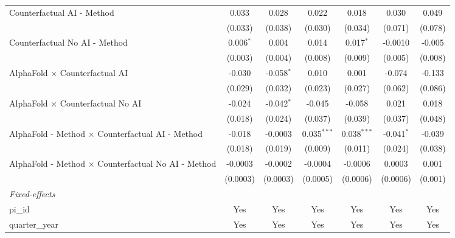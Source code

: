 \begin{tabular}{lcccccc}
   Counterfactual AI - Method                                 & 0.033       & 0.028        & 0.022         & 0.018         & 0.030        & 0.049\\   
                                                              & (0.033)     & (0.038)      & (0.030)       & (0.034)       & (0.071)      & (0.078)\\   
   Counterfactual No AI - Method                              & 0.006$^{*}$ & 0.004        & 0.014         & 0.017$^{*}$   & -0.0010      & -0.005\\   
                                                              & (0.003)     & (0.004)      & (0.008)       & (0.009)       & (0.005)      & (0.008)\\   
   AlphaFold $\times$ Counterfactual AI                       & -0.030      & -0.058$^{*}$ & 0.010         & 0.001         & -0.074       & -0.133\\   
                                                              & (0.029)     & (0.032)      & (0.023)       & (0.027)       & (0.062)      & (0.086)\\   
   AlphaFold $\times$ Counterfactual No AI                    & -0.024      & -0.042$^{*}$ & -0.045        & -0.058        & 0.021        & 0.018\\   
                                                              & (0.018)     & (0.024)      & (0.037)       & (0.039)       & (0.037)      & (0.048)\\   
   AlphaFold - Method $\times$ Counterfactual AI - Method     & -0.018      & -0.0003      & 0.035$^{***}$ & 0.038$^{***}$ & -0.041$^{*}$ & -0.039\\   
                                                              & (0.018)     & (0.019)      & (0.009)       & (0.011)       & (0.024)      & (0.038)\\   
   AlphaFold - Method $\times$ Counterfactual No AI - Method  & -0.0003     & -0.0002      & -0.0004       & -0.0006       & 0.0003       & 0.001\\   
                                                              & (0.0003)    & (0.0003)     & (0.0005)      & (0.0006)      & (0.0006)     & (0.001)\\   
   \midrule
   \emph{Fixed-effects}\\
   pi\_id                                                     & Yes         & Yes          & Yes           & Yes           & Yes          & Yes\\  
   quarter\_year                                              & Yes         & Yes          & Yes           & Yes           & Yes          & Yes\\  

\end{tabular}
